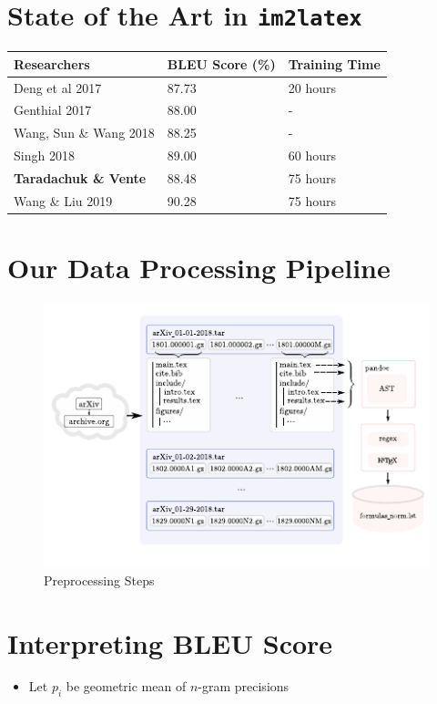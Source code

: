 \hypertarget{state-of-the-art-in-im2latex}{%
\section{\texorpdfstring{State of the Art in
\texttt{im2latex}}{State of the Art in im2latex}}\label{state-of-the-art-in-im2latex}}

\begin{longtable}[]{@{}lll@{}}
\toprule
Researchers & BLEU Score (\%) & Training Time\tabularnewline
\midrule
\endhead
Deng et al 2017 & 87.73 & 20 hours\tabularnewline
Genthial 2017 & 88.00 & -\tabularnewline
Wang, Sun \& Wang 2018 & 88.25 & -\tabularnewline
Singh 2018 & 89.00 & 60 hours\tabularnewline
\textbf{Taradachuk \& Vente} & 88.48 & 75 hours\tabularnewline
Wang \& Liu 2019 & 90.28 & 75 hours\tabularnewline
\bottomrule
\end{longtable}

\hypertarget{our-data-processing-pipeline}{%
\section{Our Data Processing
Pipeline}\label{our-data-processing-pipeline}}

\begin{figure}
\centering
\includegraphics{assets/harvest.pdf}
\caption{Preprocessing Steps}
\end{figure}

\hypertarget{interpreting-bleu-score}{%
\section{Interpreting BLEU Score}\label{interpreting-bleu-score}}

\begin{itemize}
\tightlist
\item
  Let \(p_i\) be geometric mean of \(n\)-gram precisions
\end{itemize}

